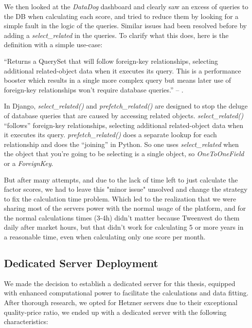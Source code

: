 \documentclass[11pt,english,a4paper,hidelinks]{book}
\begin{document}
\noindent We then looked at the \textit{DataDog} dashboard and clearly saw an excess of queries to the DB when calculating each score, and tried to reduce them by looking for a simple fault in the logic of the queries. Similar issues had been resolved before by adding a \textit{select\_related} in the queries. To clarify what this does, here is the definition with a simple use-case:

\vspace{0.5cm}
\noindent ``Returns a QuerySet that will follow foreign-key relationships, selecting additional related-object data when it executes its query. This is a performance booster which results in a single more complex query but means later use of foreign-key relationships won't require database queries.'' -- \textcite{django2025selectrelated}.

\vspace{0.5cm}
\noindent In Django, \textit{select\_related()} and \textit{prefetch\_related()} are designed to stop the deluge of database queries that are caused by accessing related objects. \textit{select\_related()} ``follows'' foreign-key relationships, selecting additional related-object data when it executes its query. \textit{prefetch\_related()} does a separate lookup for each relationship and does the ``joining'' in Python. So one uses \textit{select\_related} when the object that you're going to be selecting is a single object, so \textit{OneToOneField} or a \textit{ForeignKey}.

\vspace{0.5cm}
\noindent  But after many attempts, and due to the lack of time left to just calculate the factor scores, we had to leave this "minor issue" unsolved and change the strategy to fix the calculation time problem. Which led to the realization that we were sharing most of the servers power with the normal usage of the platform, and for the normal calculations times (3-4h) didn't matter because Tweenvest do them daily after market hours, but that didn't work for calculating 5 or more years in a reasonable time, even when calculating only one score per month.

\subsection{Dedicated Server Deployment}
\noindent We made the decision to establish a dedicated server for this thesis, equipped with enhanced computational power to facilitate the calculations and data fitting. After thorough research, we opted for Hetzner servers due to their exceptional quality-price ratio, we ended up with a dedicated server with the following characteristics:
\end{document}
